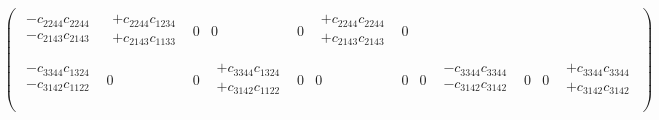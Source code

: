 \begin{eqnarray}
\begin{pmatrix}
\begin{array}{l}
-c_{2244}c_{2244} \\
-c_{2143}c_{2143} \\
\end{array} &
\begin{array}{l}
+c_{2244}c_{1234} \\
+c_{2143}c_{1133} \\
\end{array} &
0 &
0 &
0 &
\begin{array}{l}
+c_{2244}c_{2244} \\
+c_{2143}c_{2143} \\
\end{array} &
0 \\
\begin{array}{l}
-c_{3344}c_{1324} \\
-c_{3142}c_{1122} \\
\end{array} &
0 &
0 &
\begin{array}{l}
+c_{3344}c_{1324} \\
+c_{3142}c_{1122} \\
\end{array} &
0 &
0 &
0 &
0 &
\begin{array}{l}
-c_{3344}c_{3344} \\
-c_{3142}c_{3142} \\
\end{array} &
0 &
0 &
\begin{array}{l}
+c_{3344}c_{3344} \\
+c_{3142}c_{3142} \\
\end{array} \\
\end{pmatrix}
\end{eqnarray}

